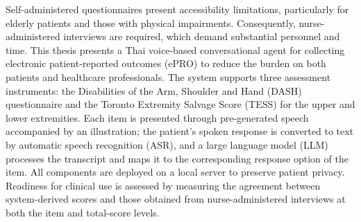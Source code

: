 \begin{englishabstract}
Self-administered questionnaires present accessibility limitations, particularly for elderly patients and those with physical impairments. Consequently, nurse-administered interviews are required, which demand substantial personnel and time. This thesis presents a Thai voice-based conversational agent for collecting electronic patient-reported outcomes (ePRO) to reduce the burden on both patients and healthcare professionals. The system supports three assessment instruments: the Disabilities of the Arm, Shoulder and Hand (DASH) questionnaire and the Toronto Extremity Salvage Score (TESS) for the upper and lower extremities. Each item is presented through pre-generated speech accompanied by an illustration; the patient's spoken response is converted to text by automatic speech recognition (ASR), and a large language model (LLM) processes the transcript and maps it to the corresponding response option of the item. All components are deployed on a local server to preserve patient privacy. Readiness for clinical use is assessed by measuring the agreement between system-derived scores and those obtained from nurse-administered interviews at both the item and total-score levels.
\end{englishabstract}
